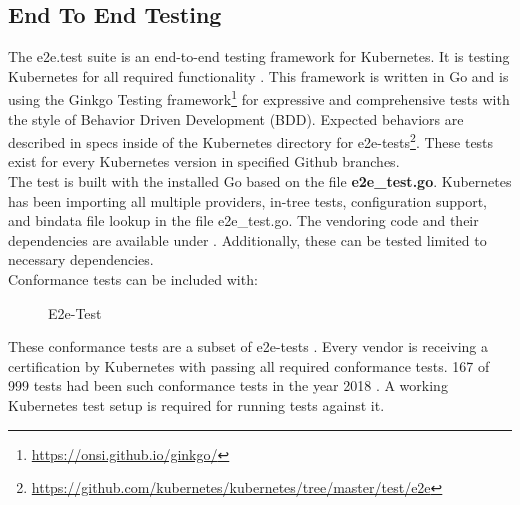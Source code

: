 \subsection{End To End Testing}
The e2e.test suite is an end-to-end testing framework for Kubernetes. It is testing Kubernetes for all required functionality \cite{Ohly2019}. This framework is written in Go and is using the Ginkgo Testing framework\footnote{\url{https://onsi.github.io/ginkgo/}} for expressive and comprehensive tests with the style of Behavior Driven Development (BDD).
Expected behaviors are described in specs inside of the Kubernetes directory for e2e-tests\footnote{\url{https://github.com/kubernetes/kubernetes/tree/master/test/e2e}}. These tests exist for every Kubernetes version in specified Github branches. \\
The test is built with the installed Go based on the file \textbf{e2e\_test.go}. Kubernetes has been importing all multiple providers, in-tree tests, configuration support, and bindata file lookup in the file e2e\_test.go.
The vendoring code and their dependencies are available under . Additionally, these can be tested limited to necessary dependencies. \\
Conformance tests can be included with: \\
\begin{figure}[H]
\centering
{}
 \caption{E2e-Test}
    \label{e2e-test}
\end{figure}

These conformance tests are a subset of e2e-tests \cite[~p.8]{Omichi2018}. Every vendor is receiving a certification by Kubernetes with passing all required conformance tests. 167 of 999 tests had been such conformance tests in the year 2018 \cite[~p.9]{Omichi2018}.
A working Kubernetes test setup is required for running tests against it.


